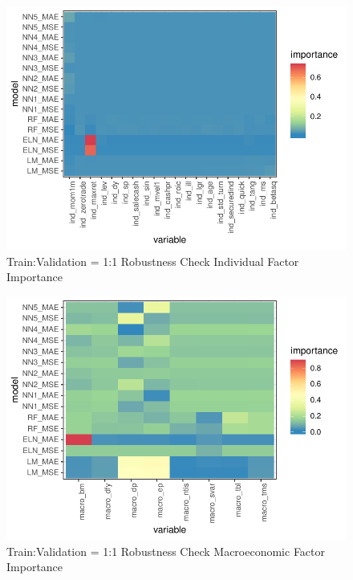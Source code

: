 \documentclass[11pt, a4paper, table]{article}
\begin{document}




\FloatBarrier


\begin{figure}
	\includegraphics[]{../Results/empirical_train_valid_1/empirical_all_sample_vi_ind.pdf}
	\caption{{Train:Validation = 1:1 Robustness Check Individual Factor Importance}}
\end{figure}

\begin{figure}
	\includegraphics[]{../Results/empirical_train_valid_1/empirical_sample_all_vi_macro.pdf}
	\caption{{Train:Validation = 1:1 Robustness Check Macroeconomic Factor Importance}}
\end{figure}
\end{document}
